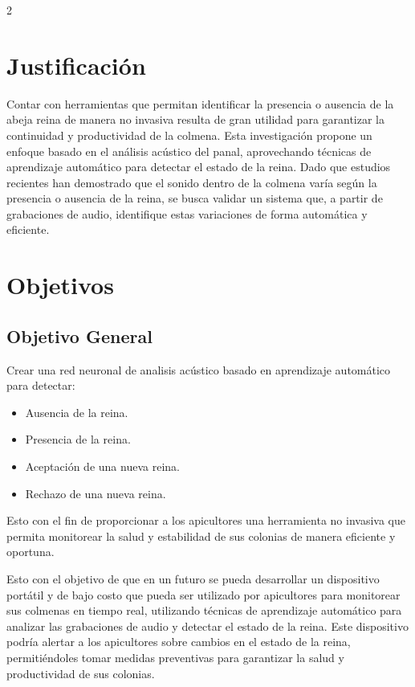 \documentclass[12pt]{report}
\newenvironment{tightmulticols}{%
  \begin{multicols}{2}
  \setlength{\parskip}{1.2pt}
  \linespread{1}\selectfont
}{%
  \end{multicols}
}
\begin{document}
\begin{tightmulticols}

\section{Justificación}

\noindent Contar con herramientas que permitan identificar la presencia o ausencia de la abeja reina de manera no invasiva resulta de gran utilidad para garantizar la continuidad y productividad de la colmena. Esta investigación propone un enfoque basado en el análisis acústico del panal, aprovechando técnicas de aprendizaje automático para detectar el estado de la reina. Dado que estudios recientes han demostrado que el sonido dentro de la colmena varía según la presencia o ausencia de la reina\cite{ruvinga2021, maarefremote, howard2013, ruvinga2023}, se busca validar un sistema que, a partir de grabaciones de audio, identifique estas variaciones de forma automática y eficiente.


\section{Objetivos}

\subsection{Objetivo General}


\noindent Crear una red neuronal de analisis acústico basado en aprendizaje automático para detectar:
\begin{itemize}
    \item Ausencia de la reina.
    \item Presencia de la reina.
    \item Aceptación de una nueva reina.
    \item Rechazo de una nueva reina.
\end{itemize}
Esto con el fin de proporcionar a los apicultores una herramienta no invasiva que permita monitorear la salud y estabilidad de sus colonias de manera eficiente y oportuna.

\noindent Esto con el objetivo de que en un futuro se pueda desarrollar un dispositivo portátil y de bajo costo que pueda ser utilizado por apicultores para monitorear sus colmenas en tiempo real, utilizando técnicas de aprendizaje automático para analizar las grabaciones de audio y detectar el estado de la reina. Este dispositivo podría alertar a los apicultores sobre cambios en el estado de la reina, permitiéndoles tomar medidas preventivas para garantizar la salud y productividad de sus colonias.


\end{tightmulticols}
\end{document}
